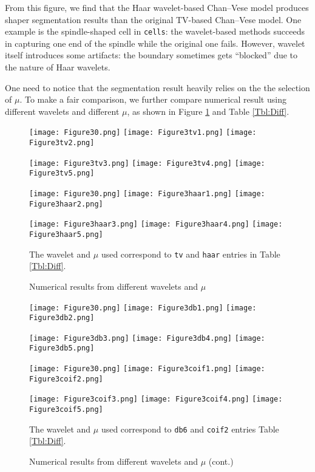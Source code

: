 \documentclass[english, nochinese]{pnote}
\begin{document}
From this figure, we find that the Haar wavelet-based Chan--Vese model produces shaper segmentation results than the original TV-based Chan--Vese model. One example is the spindle-shaped cell in \verb"cells": the wavelet-based methods succeeds in capturing one end of the spindle while the original one fails. However, wavelet itself introduces some artifacts: the boundary sometimes gets ``blocked'' due to the nature of Haar wavelets.

One need to notice that the segmentation result heavily relies on the the selection of $\mu$. To make a fair comparison, we further compare numerical result using different wavelets and different $\mu$, as shown in Figure \ref{Fig:Diff} and Table \ref{Tbl:Diff}.

\begin{figure}[htbp]
{
\centering

\texttt{[image: Figure30.png]}
\texttt{[image: Figure3tv1.png]}
\texttt{[image: Figure3tv2.png]}

\texttt{[image: Figure3tv3.png]}
\texttt{[image: Figure3tv4.png]}
\texttt{[image: Figure3tv5.png]}

\texttt{[image: Figure30.png]}
\texttt{[image: Figure3haar1.png]}
\texttt{[image: Figure3haar2.png]}

\texttt{[image: Figure3haar3.png]}
\texttt{[image: Figure3haar4.png]}
\texttt{[image: Figure3haar5.png]}

\caption{Numerical results from different wavelets and $\mu$}
\label{Fig:Diff}
}
{
\footnotesize The wavelet and $\mu$ used correspond to \verb"tv" and \verb"haar" entries in Table \ref{Tbl:Diff}.
}
\end{figure}

\begin{figure}[htbp]
{
\ContinuedFloat
\centering

\texttt{[image: Figure30.png]}
\texttt{[image: Figure3db1.png]}
\texttt{[image: Figure3db2.png]}

\texttt{[image: Figure3db3.png]}
\texttt{[image: Figure3db4.png]}
\texttt{[image: Figure3db5.png]}

\texttt{[image: Figure30.png]}
\texttt{[image: Figure3coif1.png]}
\texttt{[image: Figure3coif2.png]}

\texttt{[image: Figure3coif3.png]}
\texttt{[image: Figure3coif4.png]}
\texttt{[image: Figure3coif5.png]}

\caption{Numerical results from different wavelets and $\mu$ (cont.)}
}
{
\footnotesize The wavelet and $\mu$ used correspond to \verb"db6" and \verb"coif2" entries Table \ref{Tbl:Diff}.
}
\end{figure}
\end{document}
